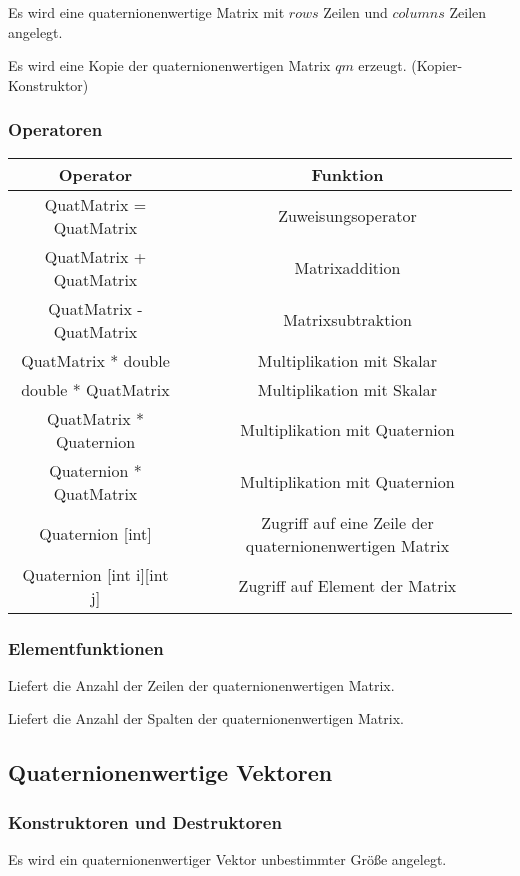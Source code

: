 \descr
{
Es wird eine quaternionenwertige Matrix mit $rows$ Zeilen und $columns$
Zeilen angelegt.
}

\descr
{
Es wird eine Kopie der quaternionenwertigen Matrix $qm$ erzeugt.
(Kopier-Konstruktor)
}

\subsubsection{Operatoren}
\begin{tabular}{|c|c|}
\hline
Operator & Funktion\\ 
\hline
QuatMatrix = QuatMatrix & Zuweisungsoperator\\
\hline
QuatMatrix + QuatMatrix & Matrixaddition\\
\hline
QuatMatrix - QuatMatrix & Matrixsubtraktion\\
\hline
QuatMatrix * double & Multiplikation mit Skalar\\
\hline
double * QuatMatrix & Multiplikation mit Skalar\\
\hline
QuatMatrix * Quaternion & Multiplikation mit Quaternion\\
\hline
Quaternion * QuatMatrix & Multiplikation mit Quaternion\\
\hline
Quaternion [int] & Zugriff auf eine Zeile der quaternionenwertigen Matrix\\
\hline
Quaternion [int i][int j] & Zugriff auf Element der Matrix
\end{tabular}

\subsubsection{Elementfunktionen}
\descr
{
Liefert die Anzahl der Zeilen der quaternionenwertigen Matrix.
}

\descr
{
Liefert die Anzahl der Spalten der quaternionenwertigen Matrix.
}
\subsection{Quaternionenwertige Vektoren}
\hypertarget{QuatVector}{}
\subsubsection{Konstruktoren und Destruktoren}
\descr
{
Es wird ein quaternionenwertiger Vektor unbestimmter Größe angelegt.
}

